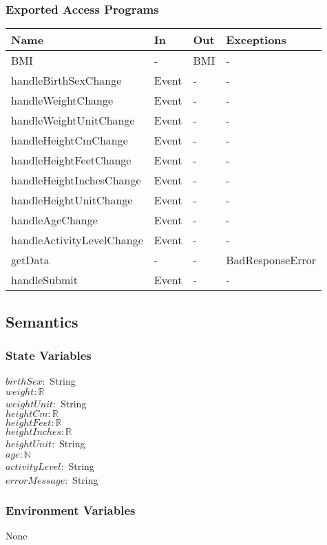 \documentclass[12pt, titlepage]{article}
\begin{document}
\subsubsection{Exported Access Programs}
\begin{center}
	\begin{tabular}{p{4.8cm} p{4cm} p{4cm} p{4cm}}
		\hline
		\textbf{Name} & \textbf{In} & \textbf{Out} & \textbf{Exceptions} \\
		\hline
		BMI & - & BMI & - \\
		handleBirthSexChange & Event & - & -\\
		handleWeightChange & Event & - & -\\
		handleWeightUnitChange & Event & - & -\\
		handleHeightCmChange & Event & - & -\\
		handleHeightFeetChange & Event & - & -\\
		handleHeightInchesChange & Event & - & -\\
		handleHeightUnitChange & Event & - & -\\
		handleAgeChange & Event & - & -\\
		handleActivityLevelChange & Event & - & -\\
		getData & - & - & BadResponseError\\
		handleSubmit & Event & -&-\\ 
		\hline
	\end{tabular}
\end{center}
\subsection{Semantics}
\subsubsection{State Variables}
$birthSex: $ String \\
$weight: \mathbb{R}$ \\
$weightUnit: $ String \\
$heightCm: \mathbb{R} $ \\
$heightFeet: \mathbb{R}$  \\
$heightInches: \mathbb{R} $  \\
$heightUnit: $ String \\
$age: \mathbb{N}$ \\
$activityLevel: $ String \\
$errorMessage: $ String \\
\subsubsection{Environment Variables}
None
\end{document}
